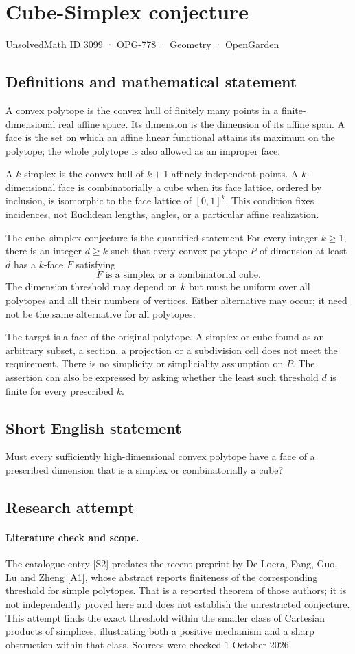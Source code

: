 \documentclass[11pt,a4paper]{article}
\begin{document}
\section*{Cube-Simplex conjecture}\label{3099}
{\small UnsolvedMath ID 3099 · OPG-778 · Geometry · OpenGarden}
\subsection{Definitions and mathematical statement}
A convex polytope is the convex hull of finitely many points in a
finite-dimensional real affine space. Its dimension is the dimension of
its affine span. A face is the set on which an affine linear functional
attains its maximum on the polytope; the whole polytope is also allowed
as an improper face.

A $k$-simplex is the convex hull of $k+1$ affinely independent points.
A $k$-dimensional face is combinatorially a cube when its face lattice,
ordered by inclusion, is isomorphic to the face lattice of $[0,1]^k$.
This condition fixes incidences, not Euclidean lengths, angles, or a
particular affine realization.

The cube--simplex conjecture is the quantified statement
For every integer $k\ge1$, there is an integer $d\ge k$ such that
 every convex polytope $P$ of dimension at least $d$ has a $k$-face $F$
 satisfying
\[
       F\text{ is a simplex or a combinatorial cube}.
\]
The dimension threshold may depend on $k$ but must be uniform over all
polytopes and all their numbers of vertices. Either alternative may occur;
it need not be the same alternative for all polytopes.

The target is a face of the original polytope. A simplex or cube found
as an arbitrary subset, a section, a projection or a subdivision cell
does not meet the requirement. There is no simplicity or simpliciality
assumption on $P$. The assertion can also be expressed by asking whether
the least such threshold $d$ is finite for every prescribed $k$.
\subsection{Short English statement}
Must every sufficiently high-dimensional convex polytope have a face of a prescribed dimension that is a simplex or combinatorially a cube?
\subsection{Research attempt}
\paragraph{Literature check and scope.}
The catalogue entry [S2] predates the recent preprint by De Loera, Fang, Guo,
Lu and Zheng [A1], whose abstract reports finiteness of the corresponding
threshold for simple polytopes. That is a reported theorem of those authors;
it is not independently proved here and does not establish the unrestricted
conjecture. This attempt finds the exact threshold within the smaller class
of Cartesian products of simplices, illustrating both a positive mechanism
and a sharp obstruction within that class. Sources were checked 1 October 2026.
\end{document}
